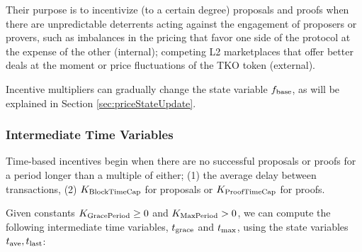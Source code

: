 \documentclass[9pt,oneside]{amsart}
\begin{document}
\begin{multicols}{2}
Their purpose is to incentivize (to a certain degree) proposals and proofs when there are unpredictable deterrents acting against the engagement of proposers or provers, such as imbalances in the pricing that favor one side of the protocol at the expense of the other (internal);  competing L2 marketplaces that offer better deals at the moment or price fluctuations of the TKO token (external).

Incentive multipliers can gradually change the state variable $f_\textnormal{base}$, as will be explained in Section \ref{sec:priceStateUpdate}.

\subsubsection{Intermediate Time Variables} 
\label{sec:intermediateTimeVar}
Time-based incentives begin when there are no successful proposals or proofs for a period longer than a multiple of either; (1) the average delay between transactions, (2) $K_\textnormal{BlockTimeCap}$ for proposals or $K_\textnormal{ProofTimeCap}$ for proofs.

Given constants $K_\textnormal{GracePeriod} \geq 0$ and $K_\textnormal{MaxPeriod} > 0$, we can compute the following intermediate time variables, $t_\textnormal{grace}$ and $t_\textnormal{max}$, 
using the state variables $t_\textnormal{ave}, t_\textnormal{last}$:


\end{multicols}
\end{document}
